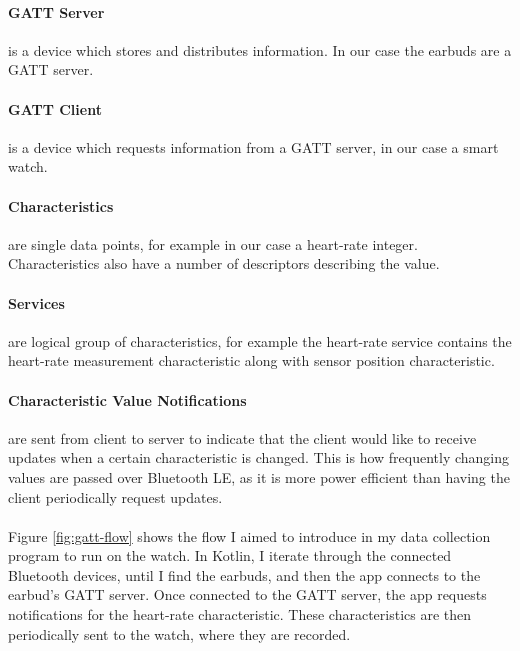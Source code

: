 \documentclass[12pt,a4paper,twoside,openright]{report}
\begin{document}
\paragraph{GATT Server} is a device which stores and distributes information. In
our case the earbuds are a GATT server.

\paragraph{GATT Client} is a device which requests information from a GATT
server, in our case a smart watch.

\paragraph{Characteristics} are single data points, for example in our case a
heart-rate integer. Characteristics also have a number of descriptors
describing the value.

\paragraph{Services} are logical group of characteristics, for example the
heart-rate service contains the heart-rate measurement characteristic along
with sensor position characteristic.

\paragraph{Characteristic Value Notifications} are sent from client to server
to indicate that the client would like to receive updates when a certain
characteristic is changed. This is how frequently changing values are passed
over Bluetooth LE, as it is more power efficient than having the client
periodically request updates.
\\
\\

Figure \ref{fig:gatt-flow} shows the flow I aimed to introduce in my data collection program to run
on the watch. In Kotlin, I iterate through the connected Bluetooth devices,
until I find the earbuds, and then the app connects to the earbud's GATT
server. Once connected 
to the GATT server, the app
requests notifications for the heart-rate characteristic. These
characteristics are then periodically sent to the watch, where they are
recorded.
\end{document}
